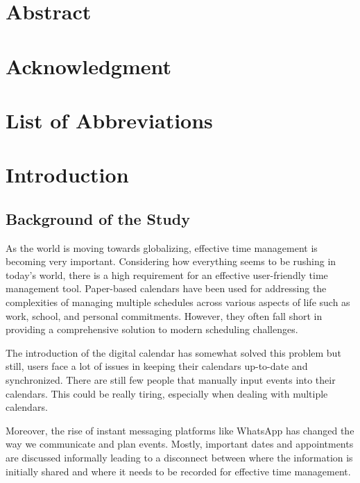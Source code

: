 \documentclass[12pt,a4paper]{report}
\begin{document}
\chapter*{Abstract}

\chapter*{Acknowledgment}
\newpage

\tableofcontents
\listoffigures
\listoftables
\newpage

\chapter*{List of Abbreviations}


\chapter{Introduction}


\section{Background of the Study}

As the world is moving towards globalizing, effective time management is becoming very important. Considering how everything seems to be rushing in today's world, there is a high requirement for an effective user-friendly time management tool. Paper-based calendars have been used for addressing the complexities of managing multiple schedules across various aspects of life such as work, school, and personal commitments. However, they often fall short in providing a comprehensive solution to modern scheduling challenges.

The introduction of the digital calendar has somewhat solved this problem but still, users face a lot of issues in keeping their calendars up-to-date and synchronized. There are still few people that manually input events into their calendars. This could be really tiring, especially when dealing with multiple calendars.

Moreover, the rise of instant messaging platforms like WhatsApp has changed the way we communicate and plan events. Mostly, important dates and appointments are discussed informally leading to a disconnect between where the information is initially shared and where it needs to be recorded for effective time management.
\end{document}
